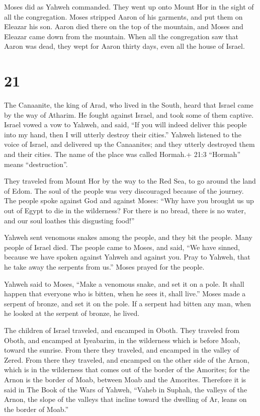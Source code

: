  Moses did as Yahweh commanded. They went up onto Mount Hor
in the sight of all the congregation.  Moses stripped Aaron
of his garments, and put them on Eleazar his son. Aaron died there on
the top of the mountain, and Moses and Eleazar came down from the
mountain.  When all the congregation saw that Aaron was
dead, they wept for Aaron thirty days, even all the house of Israel.

\hypertarget{section-20}{%
\section{21}\label{section-20}}

 The Canaanite, the king of Arad, who lived in the South,
heard that Israel came by the way of Atharim. He fought against Israel,
and took some of them captive.  Israel vowed a vow to
Yahweh, and said, ``If you will indeed deliver this people into my hand,
then I will utterly destroy their cities.''  Yahweh listened
to the voice of Israel, and delivered up the Canaanites; and they
utterly destroyed them and their cities. The name of the place was
called Hormah.+ 21:3 ``Hormah'' means ``destruction''.

 They traveled from Mount Hor by the way to the Red Sea, to
go around the land of Edom. The soul of the people was very discouraged
because of the journey.  The people spoke against God and
against Moses: ``Why have you brought us up out of Egypt to die in the
wilderness? For there is no bread, there is no water, and our soul
loathes this disgusting food!''

 Yahweh sent venomous snakes among the people, and they bit
the people. Many people of Israel died.  The people came to
Moses, and said, ``We have sinned, because we have spoken against Yahweh
and against you. Pray to Yahweh, that he take away the serpents from
us.'' Moses prayed for the people.

 Yahweh said to Moses, ``Make a venomous snake, and set it
on a pole. It shall happen that everyone who is bitten, when he sees it,
shall live.''  Moses made a serpent of bronze, and set it on
the pole. If a serpent had bitten any man, when he looked at the serpent
of bronze, he lived.

 The children of Israel traveled, and encamped in Oboth.
 They traveled from Oboth, and encamped at Iyeabarim, in
the wilderness which is before Moab, toward the sunrise. 
From there they traveled, and encamped in the valley of Zered.
 From there they traveled, and encamped on the other side
of the Arnon, which is in the wilderness that comes out of the border of
the Amorites; for the Arnon is the border of Moab, between Moab and the
Amorites.  Therefore it is said in The Book of the Wars of
Yahweh, ``Vaheb in Suphah, the valleys of the Arnon,  the
slope of the valleys that incline toward the dwelling of Ar, leans on
the border of Moab.''

